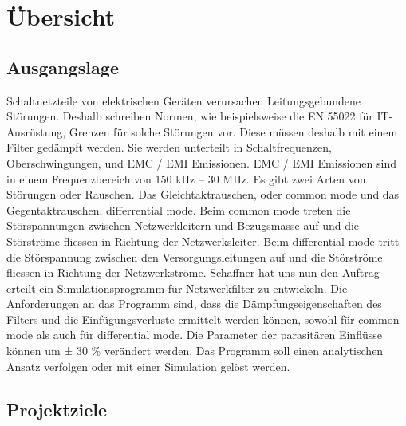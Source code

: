 \section{Übersicht} \label{sec:uebersicht}
\subsection{Ausgangslage}

Schaltnetzteile von elektrischen Geräten verursachen Leitungsgebundene Störungen. Deshalb schreiben Normen, wie beispielsweise die EN 55022 für IT-Ausrüstung, Grenzen für solche Störungen vor. Diese müssen deshalb mit einem Filter gedämpft werden. Sie werden unterteilt in Schaltfrequenzen, Oberschwingungen, und EMC / EMI Emissionen. EMC / EMI Emissionen sind in einem Frequenzbereich von 150 kHz – 30 MHz. Es gibt zwei Arten von Störungen oder Rauschen. Das Gleichtaktrauschen, oder common mode und das Gegentaktrauschen, differrential mode. Beim common mode treten die Störspannungen zwischen Netzwerkleitern und Bezugsmasse auf und die Störströme fliessen in Richtung der Netzwerksleiter. Beim differential mode tritt die Störspannung zwischen den Versorgungsleitungen auf und die Störströme fliessen in Richtung der Netzwerkströme.
Schaffner hat uns nun den Auftrag erteilt ein Simulationsprogramm für Netzwerkfilter zu entwickeln. Die Anforderungen an das Programm sind, dass die Dämpfungseigenschaften des Filters und die Einfügungsverluste ermittelt werden können, sowohl für common mode als auch für differential mode. Die Parameter der parasitären Einflüsse können um ± 30 \% verändert werden. 
Das Programm soll einen analytischen Ansatz verfolgen oder mit einer Simulation gelöst werden. 


\newpage
\subsection{Projektziele} \label{subsec:projektziele}




